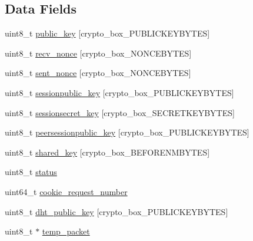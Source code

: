 \subsection*{Data Fields}
\begin{DoxyCompactItemize}
\item 
uint8\+\_\+t \hyperlink{struct_crypto___connection_aaa806bb1136fb3d4b5d8d8970b596ff7}{public\+\_\+key} \mbox{[}crypto\+\_\+box\+\_\+\+P\+U\+B\+L\+I\+C\+K\+E\+Y\+B\+Y\+T\+E\+S\mbox{]}
\item 
uint8\+\_\+t \hyperlink{struct_crypto___connection_aae0467706f97aa3ef23e5dc9c3c199d7}{recv\+\_\+nonce} \mbox{[}crypto\+\_\+box\+\_\+\+N\+O\+N\+C\+E\+B\+Y\+T\+E\+S\mbox{]}
\item 
uint8\+\_\+t \hyperlink{struct_crypto___connection_a9df0e00e8f493ed6cd1ff45e7da33c0d}{sent\+\_\+nonce} \mbox{[}crypto\+\_\+box\+\_\+\+N\+O\+N\+C\+E\+B\+Y\+T\+E\+S\mbox{]}
\item 
uint8\+\_\+t \hyperlink{struct_crypto___connection_a6e74fbae398c7966800ee80f7b93dbfa}{sessionpublic\+\_\+key} \mbox{[}crypto\+\_\+box\+\_\+\+P\+U\+B\+L\+I\+C\+K\+E\+Y\+B\+Y\+T\+E\+S\mbox{]}
\item 
uint8\+\_\+t \hyperlink{struct_crypto___connection_a5f38fc9ff1b20b61ffbb56d9e7f5c892}{sessionsecret\+\_\+key} \mbox{[}crypto\+\_\+box\+\_\+\+S\+E\+C\+R\+E\+T\+K\+E\+Y\+B\+Y\+T\+E\+S\mbox{]}
\item 
uint8\+\_\+t \hyperlink{struct_crypto___connection_ac040d4ba2a22ee327952009e7396bb2f}{peersessionpublic\+\_\+key} \mbox{[}crypto\+\_\+box\+\_\+\+P\+U\+B\+L\+I\+C\+K\+E\+Y\+B\+Y\+T\+E\+S\mbox{]}
\item 
uint8\+\_\+t \hyperlink{struct_crypto___connection_a81ead9fac55a0cedc30a96253a2c5119}{shared\+\_\+key} \mbox{[}crypto\+\_\+box\+\_\+\+B\+E\+F\+O\+R\+E\+N\+M\+B\+Y\+T\+E\+S\mbox{]}
\item 
uint8\+\_\+t \hyperlink{struct_crypto___connection_ade818037fd6c985038ff29656089758d}{status}
\item 
uint64\+\_\+t \hyperlink{struct_crypto___connection_acb77d5443961bf245b63c17347b1b030}{cookie\+\_\+request\+\_\+number}
\item 
uint8\+\_\+t \hyperlink{struct_crypto___connection_ab2ecaa07625ad0ed5e07d3a1f0dcc939}{dht\+\_\+public\+\_\+key} \mbox{[}crypto\+\_\+box\+\_\+\+P\+U\+B\+L\+I\+C\+K\+E\+Y\+B\+Y\+T\+E\+S\mbox{]}
\item 
uint8\+\_\+t $\ast$ \hyperlink{struct_crypto___connection_a360adb14f743065d5c69fe29a00a06a7}{temp\+\_\+packet}
\item 

\end{DoxyCompactItemize}
